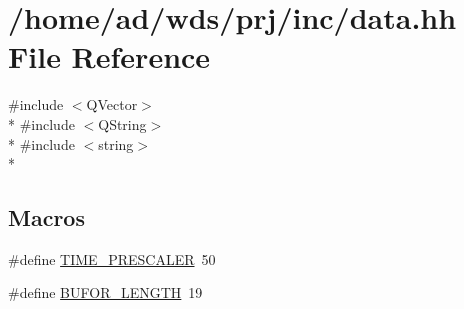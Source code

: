 \hypertarget{data_8hh}{}\section{/home/ad/wds/prj/inc/data.hh File Reference}
\label{data_8hh}
{\ttfamily \#include $<$Q\+Vector$>$}\\*
{\ttfamily \#include $<$Q\+String$>$}\\*
{\ttfamily \#include $<$string$>$}\\*
\subsection*{Macros}
\begin{DoxyCompactItemize}
\item 
\#define \hyperlink{data_8hh_a84ddc7587ef7da6fb1ae9f5c98e070ac}{T\+I\+M\+E\+\_\+\+P\+R\+E\+S\+C\+A\+L\+ER}~50
\item 
\#define \hyperlink{data_8hh_a21b07b7bdba051b0e5e6102011204b3b}{B\+U\+F\+O\+R\+\_\+\+L\+E\+N\+G\+TH}~19
\end{DoxyCompactItemize}
